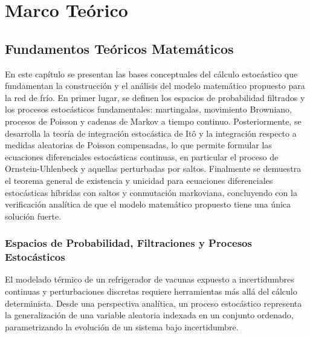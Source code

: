 \documentclass[
  spanish,
  us-letterpaper,
]{scrreprt}
\numberwithin{equation}{section}
\theoremstyle{plain}
\theoremstyle{plain}
\theoremstyle{definition}
\theoremstyle{plain}
\theoremstyle{remark}
\begin{document}
\part{Marco Teórico}

\chapter{Fundamentos Teóricos
Matemáticos}\label{sec-fundamentos-matematicos}

En este capítulo se presentan las bases conceptuales del cálculo
estocástico que fundamentan la construcción y el análisis del modelo
matemático propuesto para la red de frío. En primer lugar, se definen
los espacios de probabilidad filtrados y los procesos estocásticos
fundamentales: martingalas, movimiento Browniano, procesos de Poisson y
cadenas de Markov a tiempo continuo. Posteriormente, se desarrolla la
teoría de integración estocástica de Itô y la integración respecto a
medidas aleatorias de Poisson compensadas, lo que permite formular las
ecuaciones diferenciales estocásticas continuas, en particular el
proceso de Ornstein-Uhlenbeck y aquellas perturbadas por saltos.
Finalmente se demuestra el teorema general de existencia y unicidad para
ecuaciones diferenciales estocásticas híbridas con saltos y conmutación
markoviana, concluyendo con la verificación analítica de que el modelo
matemático propuesto tiene una única solución fuerte.

\section{Espacios de Probabilidad, Filtraciones y Procesos
Estocásticos}\label{espacios-de-probabilidad-filtraciones-y-procesos-estocuxe1sticos}

El modelado térmico de un refrigerador de vacunas expuesto a
incertidumbres continuas y perturbaciones discretas requiere
herramientas más allá del cálculo determinista. Desde una perspectiva
analítica, un proceso estocástico representa la generalización de una
variable aleatoria indexada en un conjunto ordenado, parametrizando la
evolución de un sistema bajo incertidumbre.
\end{document}
